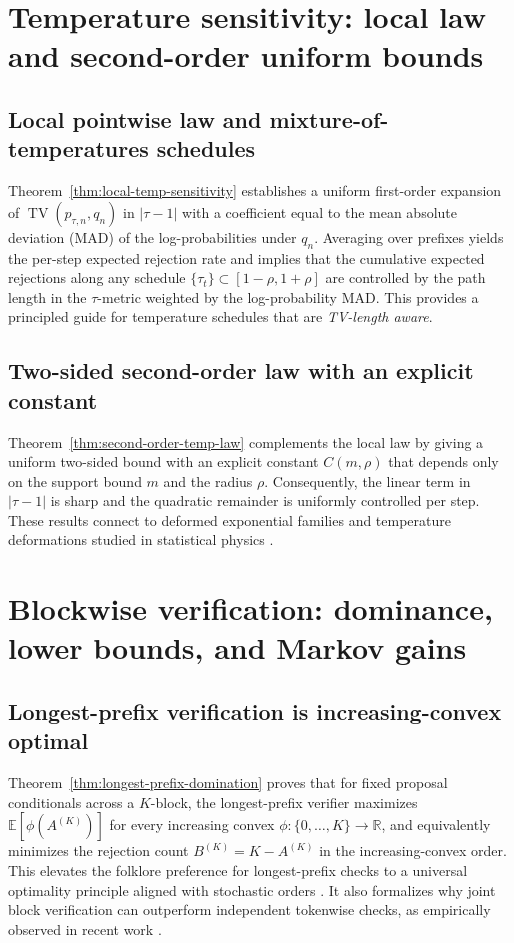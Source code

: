\documentclass[11pt]{article}
\numberwithin{equation}{section}
\theoremstyle{plain}
\theoremstyle{definition}
\theoremstyle{remark}
\newcommand{\TV}{\operatorname{TV}}
\newcommand{\E}{\mathbb{E}}
\begin{document}
\section{Temperature sensitivity: local law and second-order uniform bounds}
\label{sec:temperature}
\subsection{Local pointwise law and mixture-of-temperatures schedules}

Theorem~\ref{thm:local-temp-sensitivity} establishes a uniform first-order expansion of $\TV(p_{\tau,n},q_n)$ in $|\tau-1|$ with a coefficient equal to the mean absolute deviation (MAD) of the log-probabilities under $q_n$. Averaging over prefixes yields the per-step expected rejection rate and implies that the cumulative expected rejections along any schedule $\{\tau_t\}\subset[1-\rho,1+\rho]$ are controlled by the path length in the $\tau$-metric weighted by the log-probability MAD. This provides a principled guide for temperature schedules that are \emph{TV-length aware}.

\subsection{Two-sided second-order law with an explicit constant}

Theorem~\ref{thm:second-order-temp-law} complements the local law by giving a uniform two-sided bound with an explicit constant $C(m,\rho)$ that depends only on the support bound $m$ and the radius $\rho$. Consequently, the linear term in $|\tau-1|$ is sharp and the quadratic remainder is uniformly controlled per step. These results connect to deformed exponential families and temperature deformations studied in statistical physics \cite{Naudts2009QExponentialFamily}.

\section{Blockwise verification: dominance, lower bounds, and Markov gains}
\label{sec:block}
\subsection{Longest-prefix verification is increasing-convex optimal}

Theorem~\ref{thm:longest-prefix-domination} proves that for fixed proposal conditionals across a $K$-block, the longest-prefix verifier maximizes $\E[\phi(A^{(K)})]$ for every increasing convex $\phi:\{0,\dots,K\}\to\mathbb{R}$, and equivalently minimizes the rejection count $B^{(K)}=K-A^{(K)}$ in the increasing-convex order. This elevates the folklore preference for longest-prefix checks to a universal optimality principle aligned with stochastic orders \cite{ShakedShanthikumar2007StochasticOrders}. It also formalizes why joint block verification can outperform independent tokenwise checks, as empirically observed in recent work \cite{Sun2024BlockVerification}.
\end{document}
